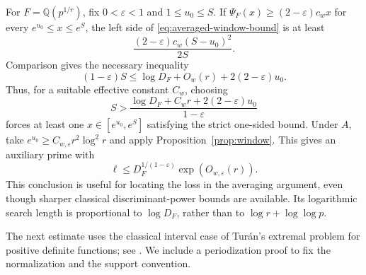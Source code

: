 \documentclass[11pt]{article}
\theoremstyle{definition}
\theoremstyle{remark}
\begin{document}
For $F=\mathbb Q(p^{1/r})$, fix $0<\varepsilon<1$ and $1\leq u_0\leq S$.
If $\Psi_F(x)\geq(2-\varepsilon)c_wx$ for every
$e^{u_0}\leq x\leq e^S$, the left side of
\eqref{eq:averaged-window-bound} is at least
\[
 \frac{(2-\varepsilon)c_w(S-u_0)^2}{2S}.
\]
Comparison gives the necessary inequality
\begin{equation}\label{eq:window-scale-obstruction}
 (1-\varepsilon)S
 \leq\log D_F+O_w(r)+2(2-\varepsilon)u_0.
\end{equation}
Thus, for a suitable effective constant $C_w$, choosing
\[
 S>\frac{\log D_F+C_wr+2(2-\varepsilon)u_0}{1-\varepsilon}
\]
forces at least one $x\in[e^{u_0},e^S]$ satisfying the strict
one-sided bound.  Under $A$, take
$e^{u_0}\geq C_{w,\varepsilon}r^2\log^2r$ and apply
Proposition~\ref{prop:window}.  This gives an auxiliary prime with
\begin{equation}\label{eq:averaged-auxiliary-bound}
 \ell\leq D_F^{1/(1-\varepsilon)}
                  \exp(O_{w,\varepsilon}(r)).
\end{equation}
This conclusion is useful for locating the loss in the averaging
argument, even though sharper classical discriminant-power bounds are
available.  Its logarithmic search length is proportional to
$\log D_F$, rather than to $\log r+\log\log p$.

The next estimate uses the classical interval case of Tur\'an's
extremal problem for positive definite functions; see
\citet[author version, Theorem~6, equation~(29), p.~14,
and Remark~4, p.~15]{KR2006Turan}.  We include a periodization
proof to fix the normalization and the support convention.
\end{document}

